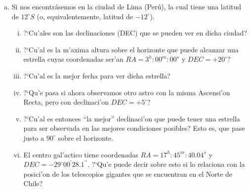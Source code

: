 \documentclass{article}
\begin{document}
\begin{enumerate}[a)]
\vspace{3mm}

\item Si nos encontrásemos en la ciudad de Lima (Perú), la cual tiene una latitud de $12^{\circ} S$ (o, equivalentemente, latitud de $-12^{\circ}$). 

\begin{enumerate} [i)]

\item ?`Cu'ales son las declinaciones (DEC) que se pueden ver en dicha ciudad?

\item ?`Cu'al es la m'axima altura sobre el horizonte que puede alcanzar una estrella cuyas coordenadas ser'an $RA = 3^h : 00^m : 00^s$ y $DEC = +20^{\circ}$?

\item ?`Cu'al es la mejor fecha para ver dicha estrella?

\item ?`Qu'e pasa si ahora observamos otro astro con la misma Ascensi'on Recta, pero con declinaci'on $DEC = +5^{\circ}$?

\item ?`Cu'al es entonces ``la mejor'' declinaci'on que puede tener una estrella para ser observada en las mejores condiciones posibles? Esto es, que pase justo a $90^{\circ}$ sobre el horizonte.

\item El centro gal'actico tiene coordenadas $RA = 17^h:45^m:40.04^s$ y $DEC = -29^{\circ} 00^{\prime} 28.1^{\prime \prime}$. ?`Qu'e puede decir sobre esto si lo relaciona con la posici'on de los telescopios gigantes que se encuentran en el Norte de Chile?
\end{enumerate}
\end{enumerate}
\end{document}
